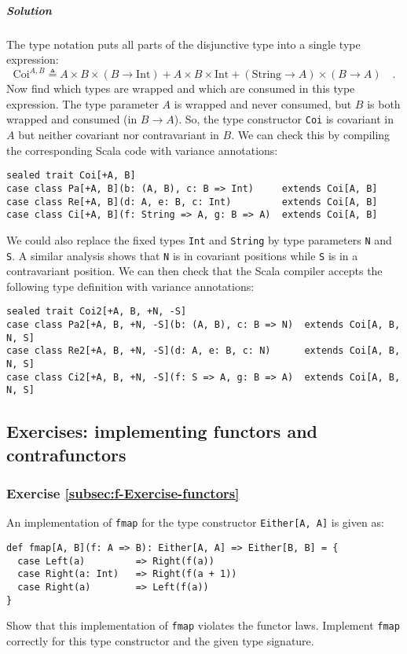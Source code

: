 \subparagraph{Solution}

The type notation puts all parts of the disjunctive type into a single
type expression:
\[
\text{Coi}^{A,B}\triangleq A\times B\times(B\rightarrow\text{Int})+A\times B\times\text{Int}+(\text{String}\rightarrow A)\times(B\rightarrow A)\quad.
\]
Now find which types are wrapped and which are consumed in this type
expression. The type parameter $A$ is wrapped and never consumed,
but $B$ is both wrapped and consumed (in $B\rightarrow A$). So,
the type constructor \lstinline!Coi! is covariant in $A$ but neither
covariant nor contravariant in $B$. We can check this by compiling
the corresponding Scala code with variance annotations:
\begin{lstlisting}
sealed trait Coi[+A, B]
case class Pa[+A, B](b: (A, B), c: B => Int)     extends Coi[A, B]
case class Re[+A, B](d: A, e: B, c: Int)         extends Coi[A, B]
case class Ci[+A, B](f: String => A, g: B => A)  extends Coi[A, B]
\end{lstlisting}
We could also replace the fixed types \lstinline!Int! and \lstinline!String!
by type parameters \lstinline!N! and \lstinline!S!. A similar analysis
shows that \lstinline!N! is in covariant positions while \lstinline!S!
is in a contravariant position. We can then check that the Scala compiler
accepts the following type definition with variance annotations:
\begin{lstlisting}
sealed trait Coi2[+A, B, +N, -S]
case class Pa2[+A, B, +N, -S](b: (A, B), c: B => N)  extends Coi[A, B, N, S]
case class Re2[+A, B, +N, -S](d: A, e: B, c: N)      extends Coi[A, B, N, S]
case class Ci2[+A, B, +N, -S](f: S => A, g: B => A)  extends Coi[A, B, N, S]
\end{lstlisting}


\subsection{Exercises: implementing functors and contrafunctors}

\subsubsection{Exercise \label{subsec:f-Exercise-functors}\ref{subsec:f-Exercise-functors}}

An implementation of \lstinline!fmap! for the type constructor \lstinline!Either[A, A]!
is given as:
\begin{lstlisting}
def fmap[A, B](f: A => B): Either[A, A] => Either[B, B] = {
  case Left(a)         => Right(f(a))
  case Right(a: Int)   => Right(f(a + 1))
  case Right(a)        => Left(f(a))
}
\end{lstlisting}
Show that this implementation of \lstinline!fmap! violates the functor
laws. Implement \lstinline!fmap! correctly for this type constructor
and the given type signature.

